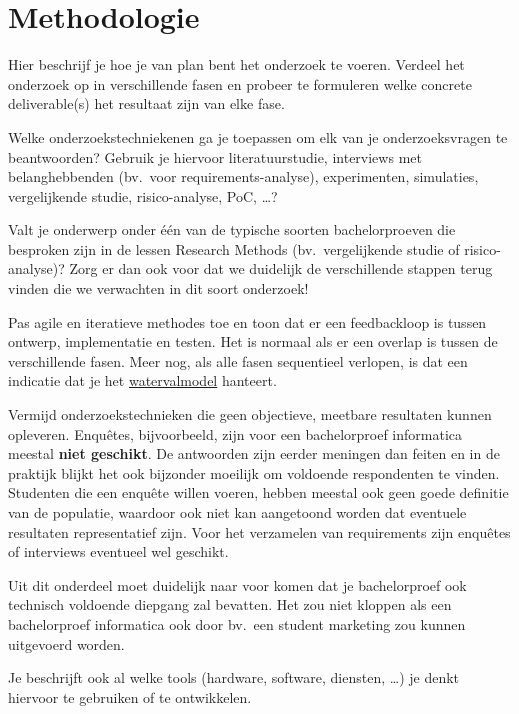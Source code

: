 \documentclass{hogent-article}
\begin{document}
\section{Methodologie}%
\label{sec:methodologie}


Hier beschrijf je hoe je van plan bent het onderzoek te voeren. Verdeel het onderzoek op in verschillende fasen en probeer te formuleren welke concrete deliverable(s) het resultaat zijn van elke fase.

Welke onderzoekstechniekenen ga je toepassen om elk van je onderzoeksvragen te beantwoorden? Gebruik je hiervoor literatuurstudie, interviews met belanghebbenden (bv.\ voor re\-quire\-ments-a\-na\-ly\-se), experimenten, simulaties, vergelijkende studie, risico-analyse, PoC, \ldots?

Valt je onderwerp onder één van de typische soorten bachelorproeven die besproken zijn in de lessen Research Methods (bv.\ vergelijkende studie of risico-analyse)? Zorg er dan ook voor dat we duidelijk de verschillende stappen terug vinden die we verwachten in dit soort onderzoek!

Pas agile en iteratieve methodes toe en toon dat er een feedbackloop is tussen ontwerp, implementatie en testen. Het is normaal als er een overlap is tussen de verschillende fasen. Meer nog, als alle fasen sequentieel verlopen, is dat een indicatie dat je het \href{https:/commando/en.wikipedia.org/wiki/Waterfall_model}{watervalmodel} hanteert.

Vermijd onderzoekstechnieken die geen objectieve, meetbare resultaten kunnen opleveren. Enquêtes, bijvoorbeeld, zijn voor een bachelorproef informatica meestal \textbf{niet geschikt}. De antwoorden zijn eerder meningen dan feiten en in de praktijk blijkt het ook bijzonder moeilijk om voldoende respondenten te vinden. Studenten die een enquête willen voeren, hebben meestal ook geen goede definitie van de populatie, waardoor ook niet kan aangetoond worden dat eventuele resultaten representatief zijn. Voor het verzamelen van requirements zijn enquêtes of interviews eventueel wel geschikt.

Uit dit onderdeel moet duidelijk naar voor komen dat je bachelorproef ook technisch voldoen\-de diepgang zal bevatten. Het zou niet kloppen als een bachelorproef informatica ook door bv.\ een student marketing zou kunnen uitgevoerd worden.

Je beschrijft ook al welke tools (hardware, software, diensten, \ldots) je denkt hiervoor te gebruiken of te ontwikkelen.
\end{document}
